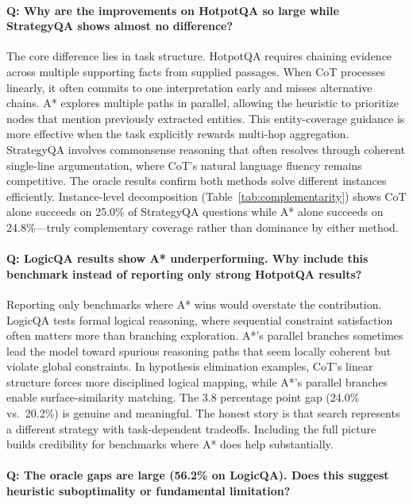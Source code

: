 \documentclass[11pt]{article}
\begin{document}
\paragraph{Q: Why are the improvements on HotpotQA so large while StrategyQA shows almost no difference?}

The core difference lies in task structure. HotpotQA requires chaining evidence across multiple supporting facts from supplied passages. When CoT processes linearly, it often commits to one interpretation early and misses alternative chains. A* explores multiple paths in parallel, allowing the heuristic to prioritize nodes that mention previously extracted entities. This entity-coverage guidance is more effective when the task explicitly rewards multi-hop aggregation. StrategyQA involves commonsense reasoning that often resolves through coherent single-line argumentation, where CoT's natural language fluency remains competitive. The oracle results confirm both methods solve different instances efficiently. Instance-level decomposition (Table~\ref{tab:complementarity}) shows CoT alone succeeds on 25.0\% of StrategyQA questions while A* alone succeeds on 24.8\%---truly complementary coverage rather than dominance by either method.

\paragraph{Q: LogicQA results show A* underperforming. Why include this benchmark instead of reporting only strong HotpotQA results?}

Reporting only benchmarks where A* wins would overstate the contribution. LogicQA tests formal logical reasoning, where sequential constraint satisfaction often matters more than branching exploration. A*'s parallel branches sometimes lead the model toward spurious reasoning paths that seem locally coherent but violate global constraints. In hypothesis elimination examples, CoT's linear structure forces more disciplined logical mapping, while A*'s parallel branches enable surface-similarity matching. The 3.8 percentage point gap (24.0\% vs.\ 20.2\%) is genuine and meaningful. The honest story is that search represents a different strategy with task-dependent tradeoffs. Including the full picture builds credibility for benchmarks where A* does help substantially.

\paragraph{Q: The oracle gaps are large (56.2\% on LogicQA). Does this suggest heuristic suboptimality or fundamental limitation?}
\end{document}

